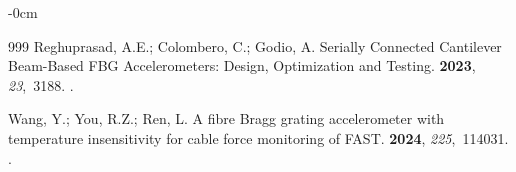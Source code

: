 \documentclass[sensors,article,accept,pdftex,moreauthors]{Definitions/mdpi}
\begin{document}
\begin{adjustwidth}{-\extralength}{0cm}
\begin{thebibliography}{999}
Reghuprasad, A.E.; Colombero, C.; Godio, A.
\newblock Serially Connected Cantilever Beam-Based FBG Accelerometers: Design, Optimization and Testing.
 {\bf 2023}, {\em 23},~3188.
.

Wang, Y.; You, R.Z.; Ren, L.
\newblock A fibre Bragg grating accelerometer with temperature insensitivity for cable force monitoring of FAST.
 {\bf 2024}, {\em 225},~114031.
.

\end{thebibliography}




	\PublishersNote{}
\end{adjustwidth}
\end{document}

